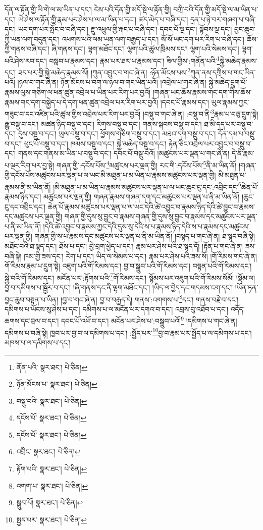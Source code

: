 དོན་ལ་རྟོན་གྱི་ཡི་གེ་ལ་མ་ཡིན་པ་དང་། ངེས་པའི་དོན་གྱི་མདོ་སྡེ་ལ་རྟོན་གྱི། བཀྲི་བའི་དོན་གྱི་མདོ་སྡེ་ལ་མ་ཡིན་པ་དང་། ཡེ་ཤེས་ལ་རྟོན་གྱི་རྣམ་པར་ཤེས་པ་ལ་མ་ཡིན་པ་དང་། ཚད་མེད་པ་བཞི་དང་། དྲན་པ་ཉེ་བར་གཞག་པ་བཞི་དང་། ཡང་དག་པར་སྤོང་བ་བཞི་དང་། རྫུ་འཕྲུལ་གྱི་རྐང་པ་བཞི་དང་། དབང་པོ་ལྔ་དང་། སྟོབས་ལྔ་དང་། བྱང་ཆུབ་ཀྱི་ཡན་ལག་བདུན་དང་། འཕགས་པའི་ལམ་ཡན་ལག་བརྒྱད་པ་དང་། སོ་སོ་ཡང་དག་པར་རིག་པ་བཞི་དང་། ཆོས་ཀྱི་གནས་བཞི་དང་། ཞི་གནས་དང་། ལྷག་མཐོང་དང་། ལྷག་པའི་ཚུལ་ཁྲིམས་དང་། ལྷག་པའི་སེམས་དང་། ལྷག་པའི་ཤེས་རབ་དང་། བསླབ་པ་རྣམས་དང་། རྣམ་པར་ཐར་པ་རྣམས་དང་། ཟིལ་གྱིས་:གནོན་པའི་\footnote{ནོན་པའི་  སྣར་ཐང་།  པེ་ཅིན། }སྐྱེ་མཆེད་རྣམས་དང་། ཟད་པར་གྱི་སྐྱེ་མཆེད་རྣམས་སོ། །ཀུན་འབྱུང་བ་གང་ཞེ་ན། :ཉོན་མོངས་པས་\footnote{ཉོན་མོངས་པ་  སྣར་ཐང་།  པེ་ཅིན། }ཀུན་ནས་དཀྲིས་པ་གང་ཡིན་པའོ། །ཉལ་བ་གང་ཞེ་ན། ཉོན་མོངས་པ་བག་ལ་ཉལ་བ་གང་ཡིན་པའོ། །འབྲེལ་པ་གང་ཞེ་ན། སྐྱེ་མཆེད་དྲུག་པོ་རྣམས་ལུས་གཅིག་ལ་ཕན་ཚུན་འབྲེལ་པ་ཡིན་པར་རིག་པར་བྱའོ། །གཞན་ཡང་ཆོས་རྣམས་གང་དག་གིས་ཆོས་རྣམས་གང་དག་བསྐྱེད་པ་དེ་དག་ཕན་ཚུན་འབྲེལ་པར་རིག་པར་བྱའོ། །དབང་པོ་རྣམས་དང་། ཡུལ་རྣམས་ཀྱང་གཟུང་བ་དང་འཛིན་པའི་ཚུལ་གྱིས་འབྲེལ་པར་རིག་པར་བྱའོ། །བསྡུ་བ་གང་ཞེ་ན། :བསྡུ་བ་ནི་\footnote{བསྡུ་བའི་  སྣར་ཐང་།  པེ་ཅིན། }རྣམ་པ་བཅུ་དྲུག་སྟེ། རྒྱུ་བསྡུ་བ་དང་། མཚན་ཉིད་བསྡུ་བ་དང་། རིགས་བསྡུ་བ་དང་། གནས་སྐབས་བསྡུ་བ་དང་། ཐ་མི་དད་པར་བསྡུ་བ་དང་། དུས་བསྡུ་བ་དང་། ཡུལ་བསྡུ་བ་དང་། ཕྱོགས་གཅིག་བསྡུ་བ་དང་། མཐའ་དག་བསྡུ་བ་དང་། དོན་དམ་པ་བསྡུ་བ་དང་། ཕུང་པོ་བསྡུ་བ་དང་། ཁམས་བསྡུ་བ་དང་། སྐྱེ་མཆེད་བསྡུ་བ་དང་། རྟེན་ཅིང་འབྲེལ་པར་འབྱུང་བ་བསྡུ་བ་དང་། གནས་དང་གནས་མ་ཡིན་པ་བསྡུ་བ་དང་། དབང་པོ་བསྡུ་བའོ། །མཚུངས་པར་ལྡན་པ་གང་ཞེ་ན། དེ་ནི་རྣམ་པ་ལྔར་རིག་པར་བྱ་སྟེ། གཞན་གྱི་:དངོས་པོས་\footnote{དངོས་པོ་  སྣར་ཐང་།  པེ་ཅིན། }མཚུངས་པར་ལྡན་གྱི། རང་གི་:དངོས་པོས་\footnote{དངོས་པོ་  སྣར་ཐང་།  པེ་ཅིན། }ནི་མ་ཡིན་ནོ། །གཞན་གྱི་དངོས་པོས་མཚུངས་པར་ལྡན་པ་ལ་ཡང་མི་མཐུན་པ་མ་ཡིན་པ་རྣམས་མཚུངས་པར་ལྡན་གྱི། མི་མཐུན་པ་རྣམས་ནི་མ་ཡིན་ནོ། །མི་མཐུན་པ་མ་ཡིན་པ་རྣམས་མཚུངས་པར་ལྡན་པ་ལ་ཡང་ཆུང་ངུ་དང་:འབྲིང་དང་\footnote{འབྲིང་  སྣར་ཐང་།  པེ་ཅིན། }ཆེན་པོ་རྣམས་ཉིད་དང་། མཚུངས་པར་ལྡན་གྱི། གཞན་རྣམས་གཞན་དག་དང་མཚུངས་པར་ལྡན་པ་ནི་མ་ཡིན་ནོ། །ཆུང་ངུ་དང་འབྲིང་དང་། ཆེན་པོ་རྣམས་མཚུངས་པར་ལྡན་པ་ལ་ཡང་དེའི་ཚེ་འབྱུང་བ་རྣམས་ཉིད་དེའི་ཚེ་བྱུང་བ་རྣམས་དང་མཚུངས་པར་ལྡན་གྱི། གཞན་གྱི་དུས་སུ་བྱུང་བ་རྣམས་གཞན་གྱི་དུས་སུ་བྱུང་བ་རྣམས་དང་མཚུངས་པར་ལྡན་པ་ནི་མ་ཡིན་ནོ། །དེའི་ཚེ་འབྱུང་བ་རྣམས་ཀྱང་དེའི་དུས་སུ་དེའི་ས་པ་རྣམས་ཉིད་དེའི་ས་པ་རྣམས་དང་མཚུངས་པར་ལྡན་གྱི། གཞན་གྱི་ས་པ་རྣམས་དང་མཚུངས་པར་ལྡན་པ་ནི་མ་ཡིན་ནོ། །བསྙད་པ་གང་ཞེ་ན། ཐ་སྙད་བཞི་སྟེ། མཐོང་བའི་ཐ་སྙད་དང་། ཐོས་པ་དང་། བྱེ་བྲག་ཕྱེད་པ་དང་། རྣམ་པར་ཤེས་པའི་ཐ་སྙད་དོ། །རྟོན་པ་གང་ཞེ་ན། ཟས་བཞི་སྟེ། ཁམ་གྱི་ཟས་དང་། རེག་པ་དང་། ཡིད་ལ་སེམས་པ་དང་། རྣམ་པར་ཤེས་པའི་ཟས་སོ། །གོ་རིམས་གང་ཞེ་ན། གོ་རིམས་རྣམ་པ་དྲུག་སྟེ། འཇུག་པའི་གོ་རིམས་དང་། བྱ་བ་སྒྲུབ་པའི་གོ་རིམས་དང་། བསྟན་པའི་གོ་རིམས་དང་། སྐྱེ་བའི་གོ་རིམས་དང་། མངོན་པར་:རྟོགས་པའི་\footnote{རྟོག་པའི་  སྣར་ཐང་།  པེ་ཅིན། }གོ་རིམས་དང་། སྙོམས་པར་འཇུག་པའི་གོ་རིམས་སོམོ། །སྡོམ་ལ། བྱ་བ་དམིགས་པ་སྦྱོར་བ་དང་། །ཞི་གནས་དང་ནི་ལྷག་མཐོང་དང་། །ཡིད་ལ་བྱེད་དང་གདམས་ངག་དང་། །ཡོན་ཏན་བྱང་ཆུབ་བསྟན་པ་ཡིན། །བྱ་བ་གང་ཞེ་ན། བྱ་བ་བརྒྱད་དེ། གནས་:འགགས་པ་\footnote{འགག་པ་  སྣར་ཐང་།  པེ་ཅིན། }དང་། གནས་བརྗེ་བ་དང་། དམིགས་པ་ཡོངས་སུ་ཤེས་པ་དང་། དམིགས་པ་ལ་མངོན་པར་དགའ་བ་དང་། འབྲས་བུ་འཐོབ་པ་དང་། འདོད་ཆགས་དང་བྲལ་བ་དང་། དབང་པོ་འཕོ་བ་དང་། མངོན་པར་ཤེས་པ་:བསྒྲུབ་པའོ།\footnote{སྒྲུབ་པོ།  སྣར་ཐང་།  པེ་ཅིན། } །དམིགས་པ་གང་ཞེ་ན། དམིགས་པ་བཞི་སྟེ། ཁྱབ་པར་བྱ་བ་ལ་དམིགས་པ་དང་། :སྤྱོད་པར་\footnote{སྤྱད་པར་  སྣར་ཐང་།  པེ་ཅིན། }བྱ་བ་རྣམ་པར་སྤྱོད་པ་ལ་དམིགས་པ་དང་། མཁས་པ་ལ་དམིགས་པ་དང་། 